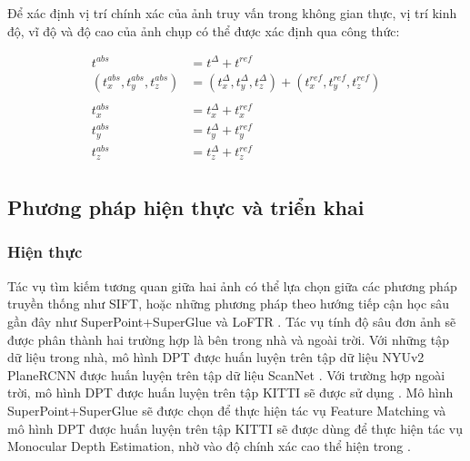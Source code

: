 Để xác định vị trí chính xác của ảnh truy vấn trong không gian thực, vị trí kinh độ, vĩ độ và độ cao của ảnh chụp có thể được xác định qua công thức:

\begin{equation}
  \begin{aligned}
    t^{abs}                         & = t^{\Delta} + t^{ref}                                                       \\
    (t^{abs}_x,t^{abs}_y,t^{abs}_z) & = (t^{\Delta}_x,t^{\Delta}_y,t^{\Delta}_z) + (t^{ref}_x,t^{ref}_y,t^{ref}_z) \\ \\
    t^{abs}_x                       & = t^{\Delta}_x + t^{ref}_x                                                   \\
    t^{abs}_y                       & = t^{\Delta}_y + t^{ref}_y                                                   \\
    t^{abs}_z                       & = t^{\Delta}_z + t^{ref}_z                                                   \\
  \end{aligned}
\end{equation}

\subsection{Phương pháp hiện thực và triển khai}
\subsubsection{Hiện thực}
Tác vụ tìm kiếm tương quan giữa hai ảnh có thể lựa chọn giữa các phương pháp truyền thống như SIFT, hoặc những phương pháp theo hướng tiếp cận học sâu gần đây như SuperPoint+SuperGlue \cite{sarlin2020superglue} và LoFTR \cite{sun2021loftr}. Tác vụ tính độ sâu đơn ảnh sẽ được phân thành hai trường hợp là bên trong nhà và ngoài trời. Với những tập dữ liệu trong nhà, mô hình DPT \cite{ranftl2021vision} được huấn luyện trên tập dữ liệu NYUv2 \cite{silberman2012indoor} PlaneRCNN \cite{liu2019planercnn} được huấn luyện trên tập dữ liệu ScanNet \cite{dai2017scannet}. Với trường hợp ngoài trời, mô hình DPT \cite{ranftl2021vision} được huấn luyện trên tập KITTI sẽ được sử dụng \cite{geiger2012we}. Mô hình SuperPoint+SuperGlue sẽ được chọn để thực hiện tác vụ Feature Matching và mô hình DPT được huấn luyện trên tập KITTI sẽ được dùng để thực hiện tác vụ Monocular Depth Estimation, nhờ vào độ chính xác cao thể hiện trong \cite{arnold2022mapfree}.

